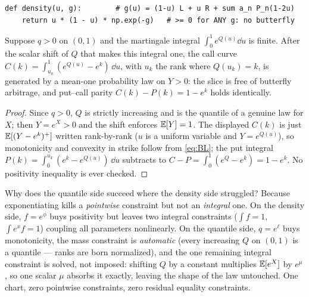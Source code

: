 \documentclass[11pt]{article}
\begin{document}
\begin{lstlisting}[caption={The LQD density is structurally non-negative ---
no constraint, no penalty (distilled from
\texttt{models/lqd/quadrature.py}).},label={lst:lqd_density}]
def density(u, g):        # g(u) = (1-u) L + u R + sum a_n P_n(1-2u)
    return u * (1 - u) * np.exp(-g)   # >= 0 for ANY g: no butterfly
\end{lstlisting}

\begin{proposition}
\label{prop:nobutterfly}
Suppose $q>0$ on $(0,1)$ and the martingale integral $\int_0^1 e^{Q(u)}\dd u$
is finite.  After the scalar shift of $Q$ that makes this integral one, the
call curve $C(k)=\int_{u_k}^{1}(e^{Q(u)}-e^{k})\,\dd u$, with $u_k$ the rank
where $Q(u_k)=k$, is generated by a mean-one probability law on $Y>0$: the
slice is free of butterfly arbitrage, and put--call parity
$C(k)-P(k)=1-e^{k}$ holds identically.
\end{proposition}

\begin{proof}
Since $q>0$, $Q$ is strictly increasing and is the quantile of a genuine law
for $X$; then $Y=e^{X}>0$ and the shift enforces $\mathbb{E}[Y]=1$.  The displayed
$C(k)$ is just $\mathbb{E}[(Y-e^{k})^{+}]$ written rank-by-rank ($u$ is a uniform
variable and $Y=e^{Q(u)}$), so monotonicity and convexity in strike follow
from \eqref{eq:BL}; the put integral
$P(k)=\int_0^{u_k}(e^{k}-e^{Q(u)})\,\dd u$ subtracts to
$C-P=\int_0^1(e^{Q}-e^{k})=1-e^{k}$.  No positivity inequality is ever
checked.
\end{proof}

\begin{heuristic}
Why does the quantile side succeed where the density side struggled?  Because
exponentiating kills a \emph{pointwise} constraint but not an \emph{integral}
one.  On the density side, $f=e^{\phi}$ buys positivity but leaves two
integral constraints ($\int f=1$, $\int e^{x}f=1$) coupling all parameters
nonlinearly.  On the quantile side, $q=e^{\ell}$ buys monotonicity, the mass
constraint is \emph{automatic} (every increasing $Q$ on $(0,1)$ is a quantile
--- ranks are born normalized), and the one remaining integral constraint is
solved, not imposed: shifting $Q$ by a constant multiplies $\mathbb{E}[e^{X}]$ by
$e^{\mu}$, so one scalar $\mu$ absorbs it exactly, leaving the shape of the
law untouched.  One chart, zero pointwise constraints, zero residual
equality constraints.
\end{heuristic}
\end{document}
